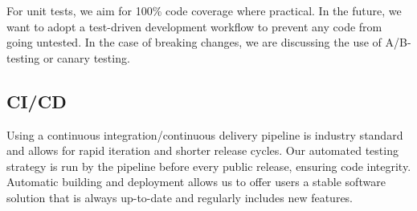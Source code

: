 \noindent{}For unit tests, we aim for 100\% code coverage where practical. In
the future, we want to adopt a test-driven development workflow to prevent any
code from going untested. In the case of breaking changes, we are discussing the
use of A/B-testing or canary testing.

\subsection{CI/CD}
Using a continuous integration/continuous delivery pipeline is industry standard
and allows for rapid iteration and shorter release cycles. Our automated testing
strategy is run by the pipeline before every public release, ensuring code
integrity. Automatic building and deployment allows us to offer users a stable
software solution that is always up-to-date and regularly includes new features.